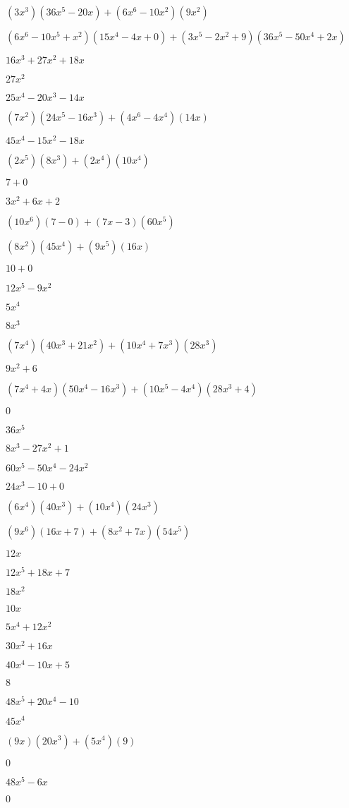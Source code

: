 \documentclass{article}
\begin{document}
\begin{multicols}{2}
$(3x^{3})(36x^{5}-20x)+(6x^{6}-10x^2)(9x^{2})$\item $(6x^{6}-10x^{5}+x^2)(15x^{4}-4x+0)+(3x^{5}-2x^2+9)(36x^{5}-50x^{4}+2x)$\item $16x^{3}+27x^{2}+18x$\item $27x^{2}$\item $25x^{4}-20x^{3}-14x$\item $(7x^2)(24x^{5}-16x^{3})+(4x^{6}-4x^{4})(14x)$\item $45x^{4}-15x^{2}-18x$\item $(2x^{5})(8x^{3})+(2x^{4})(10x^{4})$\item $7+0$\item $3x^{2}+6x+2$\item $(10x^{6})(7-0)+(7x-3)(60x^{5})$\item $(8x^2)(45x^{4})+(9x^{5})(16x)$\item $10+0$\item $12x^{5}-9x^{2}$\item $5x^{4}$\item $8x^{3}$\item $(7x^{4})(40x^{3}+21x^{2})+(10x^{4}+7x^{3})(28x^{3})$\item $9x^{2}+6$\item $(7x^{4}+4x)(50x^{4}-16x^{3})+(10x^{5}-4x^{4})(28x^{3}+4)$\item $0$\item $36x^{5}$\item $8x^{3}-27x^{2}+1$\item $60x^{5}-50x^{4}-24x^{2}$\item $24x^{3}-10+0$\item $(6x^{4})(40x^{3})+(10x^{4})(24x^{3})$\item $(9x^{6})(16x+7)+(8x^2+7x)(54x^{5})$\item $12x$\item $12x^{5}+18x+7$\item $18x^{2}$\item $10x$\item $5x^{4}+12x^{2}$\item $30x^{2}+16x$\item $40x^{4}-10x+5$\item $8$\item $48x^{5}+20x^{4}-10$\item $45x^{4}$\item $(9x)(20x^{3})+(5x^{4})(9)$\item $0$\item $48x^{5}-6x$\item $0$\item 
\end{multicols}
\end{document}
